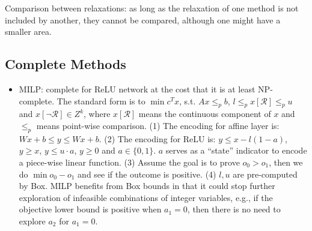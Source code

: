Comparison between relaxations: as long as the relaxation of one method is not included by another, they cannot be compared, although one might have a smaller area.

\subsection*{Complete Methods}
\begin{itemize}
    \item MILP: complete for ReLU network at the cost that it is at least NP-complete. The standard form is to $\min c^T x$, s.t. $Ax \le_p b$, $l \le_p x[\mathcal{R}] \le_p u$ and $x[\neg\mathcal{R}] \in Z^k$, where $x[\mathcal{R}]$ means the continuous component of $x$ and $\le_p$ means point-wise comparison. (1) The encoding for affine layer is: $Wx+b\le y\le Wx+b$. (2) The encoding for ReLU is: $y\le x-l(1-a)$, $y\ge x$, $y\le u\cdot a$, $y\ge 0$ and $a\in\{0,1\}$. $a$ serves as a ``state'' indicator to encode a piece-wise linear function. (3) Assume the goal is to prove $o_0>o_1$, then we do $\min o_0-o_1$ and see if the outcome is positive. (4) $l,u$ are pre-computed by Box. MILP benefits from Box bounds in that it could stop further exploration of infeasible combinations of integer variables, e.g., if the objective lower bound is positive when $a_1=0$, then there is no need to explore $a_2$ for $a_1=0$.
\end{itemize}


